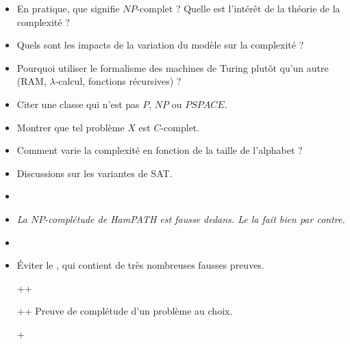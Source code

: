 \documentclass{agregfiche}
\begin{document}
\begin{itemize}
    \item En pratique, que signifie $NP$-complet ? Quelle est
      l'intérêt de la théorie de la complexité ?
    \item Quels sont les impacts de la variation du modèle sur la
    complexité ?
    \item Pourquoi utiliser le formalisme des machines de Turing
        plutôt qu'un autre (RAM, $\lambda$-calcul, fonctions
        récursives) ?
    \item Citer une classe qui n'est pas $P$, $NP$ ou $PSPACE$.
    \item Montrer que tel problème $X$ est $C$-complet.
    \item Comment varie la complexité en fonction de la taille de
    l'alphabet ?
    \item Discussions sur les variantes de SAT.
\end{itemize}

\secreferences

\begin{itemize}
    \item 
    \item 
      \textit{La $NP$-complétude de HamPATH est fausse dedans. Le  la fait bien par contre.}
    \item 
    \item Éviter le , qui contient de très nombreuses
fausses preuves.
\end{itemize}

\secdev

\begin{itemize}
    \item[++] 
    \item[++] Preuve de complétude d'un problème au choix.
    \item[+] 
\end{itemize}
\end{document}
